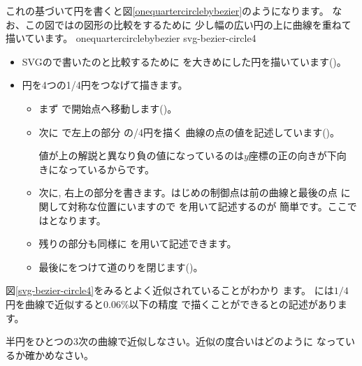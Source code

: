 これの基づいて円を書くと図\ref{onequartercirclebybezier}のようになります。
なお、この図ではの図形の比較をするために
少し幅の広い円の上に\Bezier 曲線を重ねて
描いています。
{onequartercirclebybezier}
%
{svg-bezier-circle4}
\begin{itemize}
 \item SVGので書いたのと比較するために
       を大きめにした円を描いています()。
 \item 円を4つの1/4円をつなげて描きます。
\begin{itemize}
 \item まず で開始点へ移動します()。
 \item 次に  で左上の部分
       の{/4}円を描く
       {\Bezier}曲線の点の値を記述しています()。

      値が上の解説と異なり負の値になっているのは$y$座標の正の向きが下向
       きになっているからです。
 \item 次に, 右上の部分を書きます。はじめの制御点は前の{\Bezier}曲線と最後の点
       に関して対称な位置にいますので を用いて記述するのが
       簡単です。ここではとなります。
 \item 残りの部分も同様に を用いて記述できます。
 \item 最後にをつけて道のりを閉じます()。
\end{itemize}
\end{itemize}
図\ref{svg-bezier-circle4}をみるとよく近似されていることがわかり
ます。
\cite[p.14]{Metafont}には$1/4$円を\Bezier 曲線で近似すると0.06\%以下の精度
で描くことができるとの記述があります。
\iffalse
\begin{Problem}
 上記の値を用いて半径$100$の円との誤差の割合を計算しなさい。
\end{Problem}
\fi
\begin{Problem}\upshape
 半円をひとつの3次の\Bezier 曲線で近似しなさい。近似の度合いはどのように
 なっているか確かめなさい。
\end{Problem}


